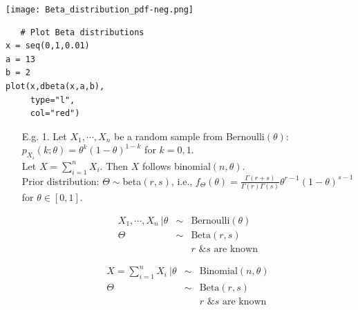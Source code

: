 \begin{frame}[fragile]

\begin{center}
 \texttt{[image: Beta\_distribution\_pdf-neg.png]}\\
 \vfill
 \begin{minipage}{0.4\textwidth}
  \begin{lstlisting}
   # Plot Beta distributions
x = seq(0,1,0.01)
a = 13
b = 2
plot(x,dbeta(x,a,b),
     type="l",
     col="red")
  \end{lstlisting}
 \end{minipage}
\end{center}

\end{frame}
\begin{frame}
\begin{enumerate}
 \item[E.g. 1.]  Let $X_1,\cdots, X_n$ be a random sample from Bernoulli$(\theta)$: $p_{X_i}(k;\theta) = \theta^k(1-\theta)^{1-k}$ for $k=0,1$.\\[1em]  \pause
 Let $X=\sum_{i=1}^n X_i$. \pause
 Then $X$ follows binomial$(n, \theta)$. \\[1em] \pause
 Prior distribution: $\Theta\sim$beta$(r,s)$, i.e., $f_\Theta(\theta)=\frac{\Gamma(r+s)}{\Gamma(r)\Gamma(s)}\theta^{r-1}(1-\theta)^{s-1}$ for $\theta\in [0,1]$. \\ \pause
 \vfill
\begin{minipage}{0.45\textwidth}
\begin{eqnarray*}
 X_1,\cdots, X_n \:\big| \theta &\sim &\text{Bernoulli$(\theta)$}\\
 \Theta & \sim& \text{Beta$(r,s)$}\\
 && \text{$r$ \& $s$ are known}
\end{eqnarray*}
\end{minipage}
\hfill
\begin{minipage}{0.45\textwidth}
\begin{eqnarray*}
 X=\sum_{i=1}^nX_i \: \bigg| \theta&\sim& \text{Binomial$(n,\theta)$}\\
 \Theta & \sim& \text{Beta$(r,s)$}\\
 && \text{$r$ \& $s$ are known}
\end{eqnarray*}
\end{minipage}
\end{enumerate}
\end{frame}
